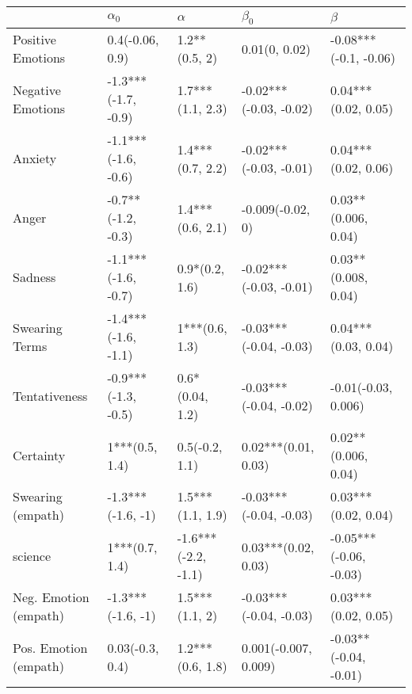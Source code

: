 \begin{tabular}{lllll}
\toprule
{} &           $\alpha_0$ &             $\alpha$ &               $\beta_0$ &                 $\beta$ \\
\midrule
Positive Emotions     &      0.4(-0.06, 0.9) &        1.2**(0.5, 2) &           0.01(0, 0.02) &   -0.08***(-0.1, -0.06) \\
Negative Emotions     &  -1.3***(-1.7, -0.9) &     1.7***(1.1, 2.3) &  -0.02***(-0.03, -0.02) &     0.04***(0.02, 0.05) \\
Anxiety               &  -1.1***(-1.6, -0.6) &     1.4***(0.7, 2.2) &  -0.02***(-0.03, -0.01) &     0.04***(0.02, 0.06) \\
Anger                 &   -0.7**(-1.2, -0.3) &     1.4***(0.6, 2.1) &        -0.009(-0.02, 0) &     0.03**(0.006, 0.04) \\
Sadness               &  -1.1***(-1.6, -0.7) &       0.9*(0.2, 1.6) &  -0.02***(-0.03, -0.01) &     0.03**(0.008, 0.04) \\
Swearing Terms        &  -1.4***(-1.6, -1.1) &       1***(0.6, 1.3) &  -0.03***(-0.04, -0.03) &     0.04***(0.03, 0.04) \\
Tentativeness         &  -0.9***(-1.3, -0.5) &      0.6*(0.04, 1.2) &  -0.03***(-0.04, -0.02) &     -0.01(-0.03, 0.006) \\
Certainty             &       1***(0.5, 1.4) &       0.5(-0.2, 1.1) &     0.02***(0.01, 0.03) &     0.02**(0.006, 0.04) \\
Swearing (empath)     &    -1.3***(-1.6, -1) &     1.5***(1.1, 1.9) &  -0.03***(-0.04, -0.03) &     0.03***(0.02, 0.04) \\
science               &       1***(0.7, 1.4) &  -1.6***(-2.2, -1.1) &     0.03***(0.02, 0.03) &  -0.05***(-0.06, -0.03) \\
Neg. Emotion (empath) &    -1.3***(-1.6, -1) &       1.5***(1.1, 2) &  -0.03***(-0.04, -0.03) &     0.03***(0.02, 0.05) \\
Pos. Emotion (empath) &      0.03(-0.3, 0.4) &     1.2***(0.6, 1.8) &    0.001(-0.007, 0.009) &   -0.03**(-0.04, -0.01) \\
\bottomrule
\end{tabular}
